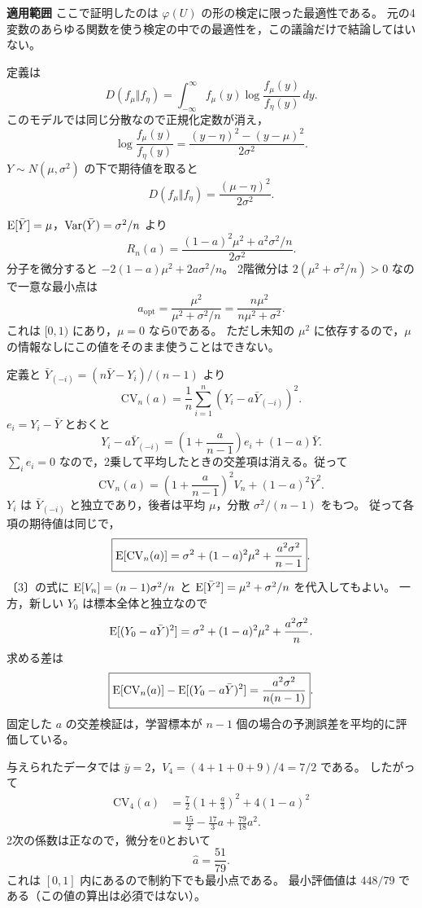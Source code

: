 \documentclass[a4paper,11pt]{ltjsarticle}
\begin{document}
\medskip
\noindent\textbf{適用範囲}
ここで証明したのは $\varphi(U)$ の形の検定に限った最適性である。
元の4変数のあらゆる関数を使う検定の中での最適性を，この議論だけで結論してはいない。
\newpage

定義は
\[
D(f_\mu\Vert f_\eta)=\int_{-\infty}^{\infty}f_\mu(y)
\log\frac{f_\mu(y)}{f_\eta(y)}\,dy.
\]
このモデルでは同じ分散なので正規化定数が消え，
\[
\log\frac{f_\mu(y)}{f_\eta(y)}
=\frac{(y-\eta)^2-(y-\mu)^2}{2\sigma^2}.
\]
$Y\sim N(\mu,\sigma^2)$ の下で期待値を取ると
\[
\boxed{D(f_\mu\Vert f_\eta)=\frac{(\mu-\eta)^2}{2\sigma^2}}.
\]

$\operatorname{E}[\bar Y]=\mu$，$\operatorname{Var}(\bar Y)=\sigma^2/n$ より
\[
\boxed{R_n(a)=\frac{(1-a)^2\mu^2+a^2\sigma^2/n}{2\sigma^2}}.
\]
分子を微分すると $-2(1-a)\mu^2+2a\sigma^2/n$。
2階微分は $2(\mu^2+\sigma^2/n)>0$ なので一意な最小点は
\[
\boxed{a_{\mathrm{opt}}=\frac{\mu^2}{\mu^2+\sigma^2/n}
=\frac{n\mu^2}{n\mu^2+\sigma^2}}.
\]
これは $[0,1)$ にあり，$\mu=0$ なら0である。
ただし未知の $\mu^2$ に依存するので，$\mu$ の情報なしにこの値をそのまま使うことはできない。

定義と $\bar Y_{(-i)}=(n\bar Y-Y_i)/(n-1)$ より
\[
\mathrm{CV}_n(a)=\frac1n\sum_{i=1}^n(Y_i-a\bar Y_{(-i)})^2.
\]
$e_i=Y_i-\bar Y$ とおくと
\[
Y_i-a\bar Y_{(-i)}
=\left(1+\frac{a}{n-1}\right)e_i+(1-a)\bar Y.
\]
$\sum_i e_i=0$ なので，2乗して平均したときの交差項は消える。従って
\[
\boxed{\mathrm{CV}_n(a)=
\left(1+\frac{a}{n-1}\right)^2V_n+(1-a)^2\bar Y^2}.
\]
\newpage
{}
$Y_i$ は $\bar Y_{(-i)}$ と独立であり，後者は平均 $\mu$，分散 $\sigma^2/(n-1)$ をもつ。
従って各項の期待値は同じで，
\[
\boxed{\operatorname{E}[\mathrm{CV}_n(a)]=\sigma^2+(1-a)^2\mu^2
+\frac{a^2\sigma^2}{n-1}}.
\]
〔3〕の式に $\operatorname{E}[V_n]=(n-1)\sigma^2/n$ と $\operatorname{E}[\bar Y^2]=\mu^2+\sigma^2/n$ を代入してもよい。
一方，新しい $Y_0$ は標本全体と独立なので
\[
\operatorname{E}[(Y_0-a\bar Y)^2]=\sigma^2+(1-a)^2\mu^2+\frac{a^2\sigma^2}{n}.
\]
求める差は
\[
\boxed{\operatorname{E}[\mathrm{CV}_n(a)]-\operatorname{E}[(Y_0-a\bar Y)^2]
=\frac{a^2\sigma^2}{n(n-1)}}.
\]
固定した $a$ の交差検証は，学習標本が $n-1$ 個の場合の予測誤差を平均的に評価している。

与えられたデータでは $\bar y=2$，$V_4=(4+1+0+9)/4=7/2$ である。
したがって
\begin{align*}
\mathrm{CV}_4(a)
&=\frac72\left(1+\frac a3\right)^2+4(1-a)^2\\
&=\frac{15}{2}-\frac{17}{3}a+\frac{79}{18}a^2.
\end{align*}
2次の係数は正なので，微分を0とおいて
\[
\boxed{\hat a=\frac{51}{79}}.
\]
これは $[0,1]$ 内にあるので制約下でも最小点である。
最小評価値は $448/79$ である（この値の算出は必須ではない）。
\end{document}
